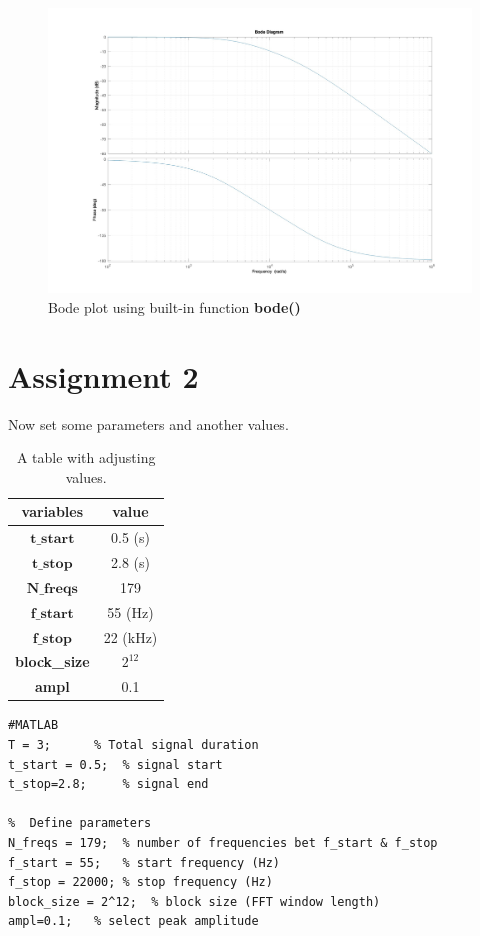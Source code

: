\documentclass[
	a4paper,
	11pt,
]{article}
\begin{document}
\begin{figure}[htb!]
    \centerline{\includegraphics[width=13cm]{figure/A1/BodePlot_bode.jpg}}
    \caption{Bode plot using built-in function \textbf{bode()}}
    \label{fig:A1_Bode_bode}
\end{figure}


\section{Assignment 2}
Now set some parameters and another values.

\begin{table}[ht]
\centering
\begin{tabular}{ c c }
\hline
variables & value \\
\hline
$\textbf{t\_start}$ & 0.5 (s) \\
$\textbf{t\_stop}$ & 2.8 (s) \\
$\textbf{N\_freqs}$ & 179 \\
$\textbf{f\_start}$ & 55 (Hz) \\
$\textbf{f\_stop}$ & 22 (kHz) \\
\textbf{block\_size} & $2^{12}$ \\
\textbf{ampl} & 0.1 \\
\hline
\end{tabular}
\caption{A table with adjusting values.}
\label{tab:ten-values}
\end{table}

\begin{verbatim}
#MATLAB
T = 3;      % Total signal duration
t_start = 0.5;  % signal start
t_stop=2.8;     % signal end

%  Define parameters 
N_freqs = 179;  % number of frequencies bet f_start & f_stop 
f_start = 55;   % start frequency (Hz)
f_stop = 22000; % stop frequency (Hz)
block_size = 2^12;  % block size (FFT window length)
ampl=0.1;   % select peak amplitude 
\end{verbatim}
\end{document}
